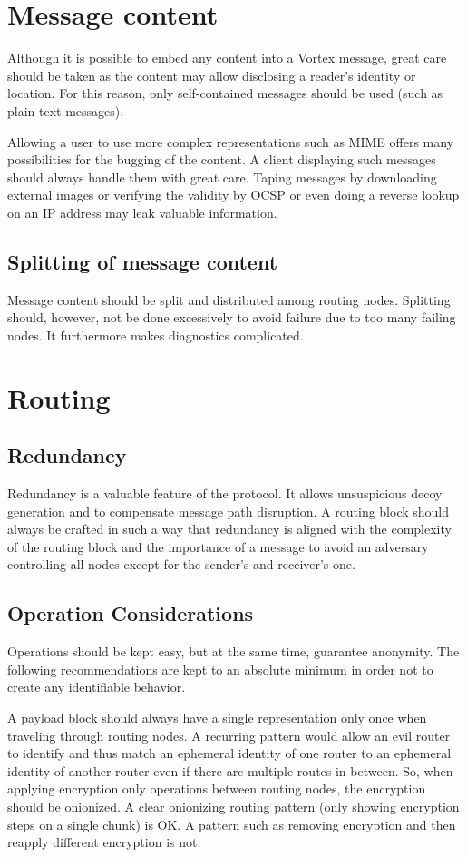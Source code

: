\section{Message content}
Although it is possible to embed any content into a Vortex message, great care should be taken as the content may allow disclosing a reader's identity or location. For this reason, only self-contained messages should be used (such as plain text messages).

Allowing a user to use more complex representations such as MIME offers many possibilities for the bugging of the content. A client displaying such messages should always handle them with great care. Taping messages by downloading external images or verifying the validity by OCSP or even doing a reverse lookup on an IP address may leak valuable information.

\subsection{Splitting of message content}
Message content should be split and distributed among routing nodes. Splitting should, however, not be done excessively to avoid failure due to too many failing nodes. It furthermore makes diagnostics complicated. 

\section{Routing}
\subsection{Redundancy}
Redundancy is a valuable feature of the protocol. It allows unsuspicious decoy generation and to compensate message path disruption. A routing block should always be crafted in such a way that redundancy is aligned with the complexity of the routing block and the importance of a message to avoid an adversary controlling all nodes except for the sender's and receiver's one.

\subsection{Operation Considerations}
Operations should be kept easy, but at the same time, guarantee anonymity. The following recommendations are kept to an absolute minimum in order not to create any identifiable behavior.

A payload block should always have a single representation only once when traveling through routing nodes. A recurring pattern would allow an evil router to identify and thus match an ephemeral identity of one router to an ephemeral identity of another router even if there are multiple routes in between. So, when applying encryption only operations between routing nodes, the encryption should be onionized. A clear onionizing routing pattern (only showing encryption steps on a single chunk) is OK. A pattern such as removing encryption and then reapply different encryption is not.

